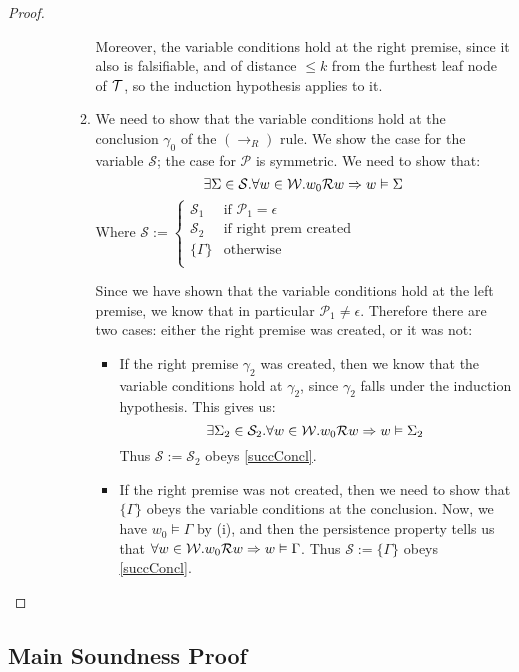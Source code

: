\documentclass{llncs}
\numberwithin{equation}{section}
\newcommand{\Pred}{{\mathcal{P}}}
\newcommand{\Succ}{{\mathcal{S}}}
\newcommand{\Imp}{\rightarrow}
\newcommand{\Force}{\vDash}
\newcommand{\MetaImp}{\Rightarrow}
\newcommand{\mycal}[1]{
        {\cal{#1}}
}
\newcommand{\tree}[1]{
        {\mycal{#1}}
}
\newcommand{\ImpRightRule}{({\Imp_R})}
\newcommand{\varsTrans}[5]{
#1 := 
\left\{ \begin{array}{ll}
        #2                                                                              & \mbox{if }    #5 = \epsilon \\                                                                                                                                                                
        #3                                                                              & \mbox{if}     \text{ right prem created} \\ 
        #4                                                                              & \mbox{otherwise} \\
        \end{array}\right.
}
\begin{document}
\begin{proof}
\begin{description}
\begin{enumerate}
\begin{enumerate}
		Moreover, the variable conditions hold at the right premise, since it also is falsifiable, and of distance $\leq k$ from the furthest leaf node of $\tree{T}$, so the induction hypothesis applies to it.

			\item We need to show that the variable conditions hold at the conclusion $\gamma_0$ of the $\ImpRightRule$ rule. We show the case for the variable $\Succ$; the case for $\Pred$ is symmetric. We need to show that:
\begin{equation}\label{succConcl}
	\exists \Sigma \in \Succ . \forall w \in \mycal{W} .w_0 \mycal{R} w \MetaImp w \Force \Sigma
\end{equation}
			Where $\varsTrans{\Succ}{\Succ_1}{\Succ_2}{\{ \Gamma \}}{\Pred_1}$
			
			Since we have shown that the variable conditions hold at the left premise, we know that in particular $\Pred_1 \ne \epsilon$. Therefore there are two cases: either the right premise was created, or it was not:
			\begin{itemize}
				\item If the right premise $\gamma_2$ was created, then we know that the variable conditions hold at $\gamma_2$, since $\gamma_2$ falls under the induction hypothesis. This gives us:
				$$\exists \Sigma_2 \in \Succ_2 . \forall w \in \mycal{W} . w_0 \mycal{R} w \MetaImp w \Force \Sigma_2$$
			Thus $\Succ := \Succ_2$ obeys \eqref{succConcl}.
				\item If the right premise was not created, then we need to show that $\{ \Gamma \}$ obeys the variable conditions at the conclusion. Now, we have $w_0 \Force \Gamma$ by (i), and then the persistence property tells us that $\forall w \in \mycal{W} .w_0 \mycal{R} w \MetaImp w \Force \Gamma$. Thus $\Succ := \{ \Gamma \}$ obeys \eqref{succConcl}.
			\end{itemize} 			
		\end{enumerate}		
		\end{enumerate}
	\end{description}		
\end{proof}

\subsection{Main Soundness Proof}
\end{document}
